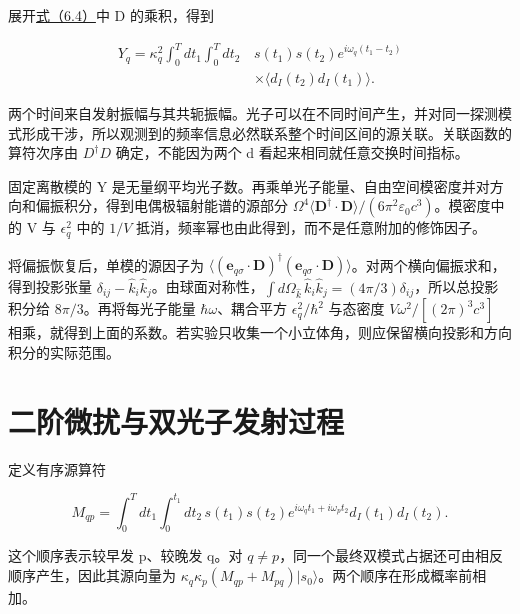 \documentclass[UTF8,a4paper,zihao=-4,openany,fontset=fandol]{ctexbook}
\begin{document}
展开\hyperref[eq:6.4]{式（6.4）}中 D 的乘积，得到



\begin{equation*}
\begin{aligned}
Y_q=\kappa_q^2\int_0^Tdt_1\int_0^Tdt_2\,
&s(t_1)s(t_2)e^{i\omega_q(t_1-t_2)}\\
&\times\langle d_I(t_2)d_I(t_1)\rangle.
\end{aligned}
\tag{6.5}\label{eq:6.5}
\end{equation*}


两个时间来自发射振幅与其共轭振幅。光子可以在不同时间产生，并对同一探测模式形成干涉，所以观测到的频率信息必然联系整个时间区间的源关联。关联函数的算符次序由 $D^\dagger D$ 确定，不能因为两个 d 看起来相同就任意交换时间指标。



固定离散模的 Y 是无量纲平均光子数。再乘单光子能量、自由空间模密度并对方向和偏振积分，得到电偶极辐射能谱的源部分 $\Omega^4\langle\mathbf D^\dagger\cdot\mathbf D\rangle/(6\pi^2\varepsilon_0c^3)$。模密度中的 V 与 $\epsilon_q^2$ 中的 $1/V$ 抵消，频率幂也由此得到，而不是任意附加的修饰因子。



将偏振恢复后，单模的源因子为 $\langle(\mathbf e_{q\sigma}\cdot\mathbf D)^\dagger(\mathbf e_{q\sigma}\cdot\mathbf D)\rangle$。对两个横向偏振求和，得到投影张量 $\delta_{ij}-\hat k_i\hat k_j$。由球面对称性，$\int d\Omega_{\hat k}\,\hat k_i\hat k_j=(4\pi/3)\delta_{ij}$，所以总投影积分给 $8\pi/3$。再将每光子能量 $\hbar\omega$、耦合平方 $\epsilon_q^2/\hbar^2$ 与态密度 $V\omega^2/[(2\pi)^3c^3]$ 相乘，就得到上面的系数。若实验只收集一个小立体角，则应保留横向投影和方向积分的实际范围。



\section{二阶微扰与双光子发射过程}\label{sec:06:8}


定义有序源算符



\begin{equation*}
M_{qp}=\int_0^Tdt_1\int_0^{t_1}dt_2\,
s(t_1)s(t_2)e^{i\omega_qt_1+i\omega_pt_2}
d_I(t_1)d_I(t_2).
\tag{6.6}\label{eq:6.6}
\end{equation*}


这个顺序表示较早发 p、较晚发 q。对 $q\ne p$，同一个最终双模式占据还可由相反顺序产生，因此其源向量为 $\kappa_q\kappa_p(M_{qp}+M_{pq})|s_0\rangle$。两个顺序在形成概率前相加。
\end{document}
